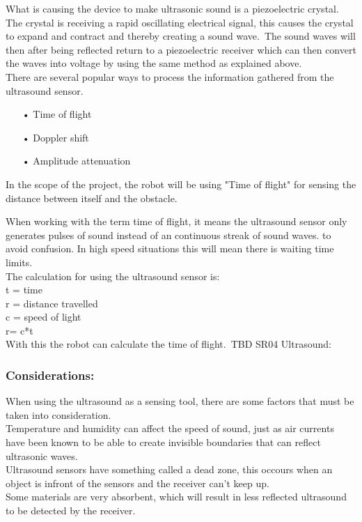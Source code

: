 What is causing the device to make ultrasonic sound is a piezoelectric crystal. The crystal is receiving a rapid oscillating electrical signal, this causes the crystal to expand and contract and thereby creating a sound wave.\ The sound waves will then after being reflected return to a piezoelectric receiver which can then convert the waves into voltage by using the same method as explained above. \\


There are several popular ways to process the information gathered from the ultrasound sensor. \\

\begin{enumerate}
	\item[•]Time of flight
	\item[•]Doppler shift
	\item[•]Amplitude attenuation
\end{enumerate}

In the scope of the project, the robot will be using "Time of flight" for sensing the distance between itself and the obstacle.\

When working with the term time of flight, it means the ultrasound sensor only generates pulses of sound instead of an continuous streak of sound waves. to avoid confusion. In high speed situations this will mean there is waiting time limits.\\ 

The calculation for using the ultrasound sensor is: \\

t = time\\
r = distance travelled\\
c = speed of light\\

r= c*t\\

With this the robot can calculate the time of flight.\
TBD SR04 Ultrasound:\
\subsubsection{Considerations:}
When using the ultrasound as a sensing tool, there are some factors that must be taken into consideration.\\ Temperature and humidity can affect the speed of sound, just as air currents have been known to be able to create invisible boundaries that can reflect ultrasonic waves.\\
Ultrasound sensors have something called a dead zone, this occours when an object is infront of the sensors and the receiver can't keep up.\\
Some materials are very absorbent, which will result in less reflected ultrasound to be detected by the receiver.

